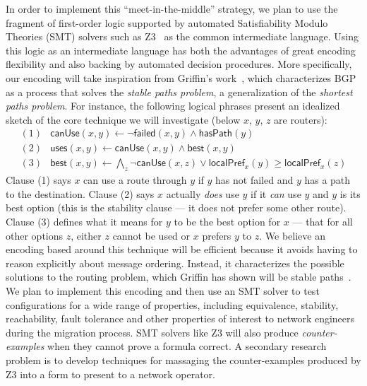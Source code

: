 In order to implement this ``meet-in-the-middle'' strategy, we plan to use the
fragment of first-order logic supported by 
automated Satisfiability Modulo Theories (SMT) solvers such as Z3~\cite{z3} as the
common intermediate language.  Using this logic as an intermediate language has both the
advantages of great encoding flexibility and also backing by automated decision procedures.
More specifically, our encoding will take 
inspiration from Griffin's work~\cite{griffin+:stable-paths},
which characterizes BGP as a process that solves the \emph{stable paths problem}, 
a generalization of the  \emph{shortest paths problem}.  
For instance, the following logical phrases present an idealized sketch of the 
core technique we will investigate (below $x$, $y$, $z$ are routers):
%
\newcommand{\pfont}[1]{\mathsf{#1}}%
%
\[
\begin{array}{ll}
(1) & \pfont{canUse}(x,y) \leftarrow \neg \pfont{failed}(x,y) \wedge \pfont{hasPath}(y) \\
(2) & \pfont{uses}(x,y) \leftarrow \pfont{canUse}(x,y) \wedge \pfont{best}(x,y) \\
(3) & \pfont{best}(x,y) \leftarrow \bigwedge_z \neg \pfont{canUse}(x,z) \vee \pfont{localPref}_x(y) \ge \pfont{localPref}_x(z) 
\end{array}
\]
Clause (1) says $x$ can use a route through $y$ if $y$ has not failed and $y$ has a path to the destination. 
Clause (2) says $x$ actually \emph{does}
use $y$ if it \emph{can} use $y$ and $y$ is its best option (this is the stability clause --- it does not prefer some other
route).  Clause (3) defines what it means for $y$ to be the best option for $x$ --- that for all other options $z$, either
$z$ cannot be used or $x$ prefers $y$ to $z$.  We believe an encoding 
based around this technique will be efficient because it avoids having to reason
explicitly about message ordering.  Instead, it characterizes the possible solutions to the routing problem, which Griffin has shown will be stable paths~\cite{griffin+:stable-paths}.
We plan to implement this encoding and then use an SMT solver to test configurations for a wide range of properties, including equivalence, 
stability, reachability, fault tolerance and other properties of interest to network engineers during the
migration process.  SMT solvers like Z3 will also produce \emph{counter-examples} 
when they cannot prove a formula correct. A secondary
research problem is to develop techniques for massaging the counter-examples produced by Z3 into a form to present
to a network operator.  

